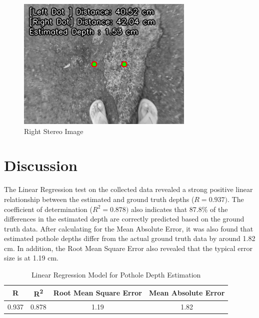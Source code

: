 \begin{figure}[htbp]
\begin{minipage}{0.32\textwidth}
		\includegraphics[width=\textwidth]{right.png}
		\caption{Right Stereo Image}
		\label{fig:image3}
	\end{minipage}
\end{figure}



\section{Discussion}
The Linear Regression test on the collected data revealed a strong positive linear relationship between the estimated and ground truth depths (\(R = 0.937)\). The coefficient of determination (\(R^{2} = 0.878)\) also indicates that 87.8\% of the differences in the estimated depth are correctly predicted based on the ground truth data. After calculating for the Mean Absolute Error, it was also found that estimated pothole depths differ from the actual ground truth data by around 1.82 cm. In addition, the Root Mean Square Error also revealed that the typical error size is at 1.19 cm.

\begin{table}[h]
	\centering
	\begin{tabular}{|c|c|c|c|}
		\hline
		\textbf{R} & \textbf{R\textsuperscript{2}} & \textbf{Root Mean Square Error} & \textbf{Mean Absolute Error} \\
		\hline
		0.937 & 0.878 & 1.19 & 1.82 \\
		\hline
	\end{tabular}
	\caption{Linear Regression Model for Pothole Depth Estimation}
	\label{tab:model_fit}
\end{table}

